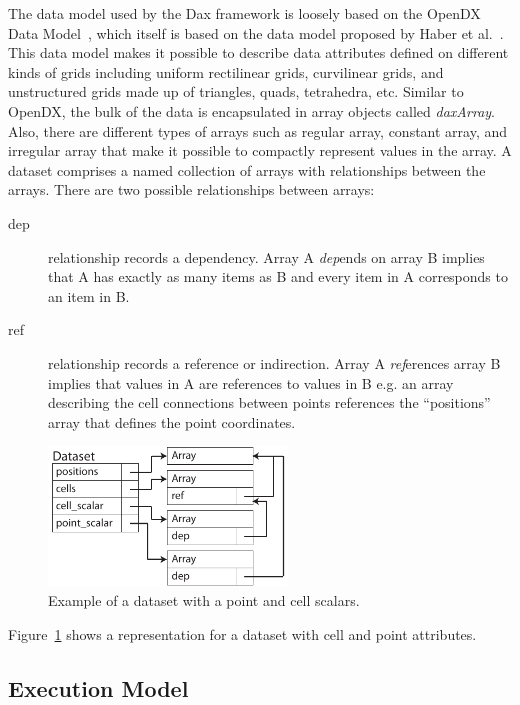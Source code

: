 \documentclass{vgtc}                          %
\newcommand*{\lcite}[1]{~\cite{#1}}
\newcommand*{\scite}[1]{~\cite{#1}}
\newcommand{\etal}{et al.}
\begin{document}
The data model used by the Dax framework is loosely based on the OpenDX Data Model\lcite{OpenDXManual},
which itself is based on the data model proposed by Haber \etal\scite{Haber1991}.
This data model makes it possible to describe data attributes defined on
different kinds of grids including uniform rectilinear grids, curvilinear grids,
and unstructured grids made up of triangles, quads, tetrahedra, etc. Similar
to OpenDX, the bulk of the data is encapsulated in array objects called
\emph{daxArray}. Also, there are different types of arrays such as
regular array, constant array, and irregular array that make it possible to
compactly represent values in the array. A dataset comprises a named
collection of arrays with relationships between the arrays. There are two
possible relationships between arrays:
\begin{description}
\item[dep] relationship records a dependency. Array A \emph{dep}ends on
array B implies that A has exactly as many items as B and every item in A
corresponds to an item in B.
\item[ref] relationship records a reference or indirection. Array A
\emph{ref}erences array B implies that values in A are references to values in
B e.g. an array describing the cell connections between points references the
``positions'' array that defines the point coordinates.
\end{description}

\begin{figure}
  \centering
  \includegraphics[width=2.5in]{images/DaxDataModel}
  \caption{Example of a dataset with a point and cell scalars.}
  \label{fig:DaxDataModel}
\end{figure}

Figure~\ref{fig:DaxDataModel} shows a representation for a dataset with cell
and point attributes.


\subsection{Execution Model}
\label{sec:ExecutionModel}
\end{document}
